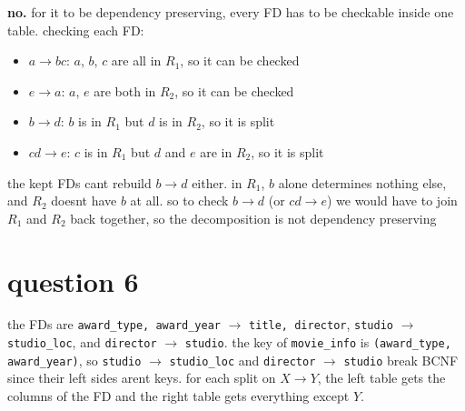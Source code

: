 \documentclass[11pt]{article}
\newcommand{\at}[1]{\texttt{#1}}
\begin{document}
\noindent\textbf{no.} for it to be dependency preserving, every FD has to be
checkable inside one table. checking each FD:
\begin{itemize}
  \item $a \to bc$: $a$, $b$, $c$ are all in $R_1$, so it can be checked
  \item $e \to a$: $a$, $e$ are both in $R_2$, so it can be checked
  \item $b \to d$: $b$ is in $R_1$ but $d$ is in $R_2$, so it is split
  \item $cd \to e$: $c$ is in $R_1$ but $d$ and $e$ are in $R_2$, so it is
    split
\end{itemize}
the kept FDs cant rebuild $b \to d$ either. in $R_1$, $b$ alone determines
nothing else, and $R_2$ doesnt have $b$ at all. so to check $b \to d$ (or
$cd \to e$) we would have to join $R_1$ and $R_2$ back together, so
the decomposition is not dependency preserving

\section*{question 6}

\noindent the FDs are \at{award\_type, award\_year} $\to$ \at{title,
director}, \at{studio} $\to$ \at{studio\_loc}, and \at{director} $\to$
\at{studio}. the key of \at{movie\_info} is \at{(award\_type, award\_year)},
so \at{studio} $\to$ \at{studio\_loc} and \at{director} $\to$ \at{studio}
break BCNF since their left sides arent keys. for each split on $X \to Y$,
the left table gets the columns of the FD and the right table gets everything
except $Y$.

\begin{center}
\end{center}
\end{document}
